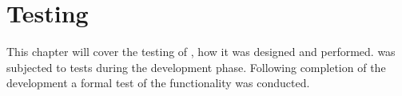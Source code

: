 \chapter{Testing}
This chapter will cover the testing of \projectname{}, how it was designed and performed.
\projectname{} was subjected to tests during the development phase.
Following completion of the development a formal test of the functionality was conducted.




